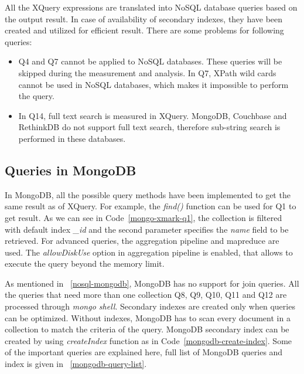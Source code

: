 All the XQuery expressions are translated into NoSQL database queries based on the output result. In case of availability of secondary indexes, they have been created and utilized for efficient result. There are some problems for following queries:
\begin{itemize}
\item Q4 and Q7 cannot be applied to NoSQL databases. These queries will be skipped during the measurement and analysis. In Q7, XPath  wild cards cannot be used in NoSQL databases, which makes it impossible to perform the query. 

\item In Q14, full text search is measured in XQuery. MongoDB, Couchbase and RethinkDB do not support full text search, therefore  sub-string search is performed in these databases. 
\end{itemize}

\subsection{Queries in MongoDB}

In MongoDB, all the possible query methods have been implemented to get the same result as of XQuery.  For example, the \textit{find()} function can be used for Q1 to get result. As we can see in  Code~\ref{mongo-xmark-q1}, the collection is filtered with default index \textit{\_id}  and the second parameter specifies the \textit{name} field to be retrieved.  For advanced queries, the aggregation pipeline and mapreduce are used.   The \textit{allowDiskUse} option in aggregation pipeline is enabled, that allows to execute the query beyond the memory limit.

As mentioned in ~\ref{nosql-mongodb}, MongoDB has no support for  join queries. All the queries that need more than one collection  Q8, Q9, Q10, Q11 and Q12  are processed through \textit{mongo shell}. Secondary indexes are created only when queries can be optimized. Without indexes, MongoDB has to scan every document in a collection to match the criteria of the query. MongoDB secondary index can be created by using \textit{createIndex} function as in Code~\ref{mongodb-create-index}. Some of the important queries are explained here, full list of MongoDB queries and index is given in ~\ref{mongodb-query-list}.

